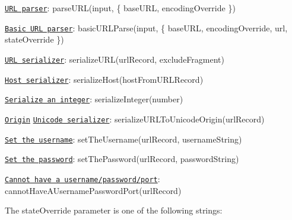 \begin{DoxyItemize}
\item \href{https://url.spec.whatwg.org/#concept-url-parser}{\tt U\+RL parser}\+: {\ttfamily parse\+U\+RL(input, \{ base\+U\+RL, encoding\+Override \})}
\item \href{https://url.spec.whatwg.org/#concept-basic-url-parser}{\tt Basic U\+RL parser}\+: {\ttfamily basic\+U\+R\+L\+Parse(input, \{ base\+U\+RL, encoding\+Override, url, state\+Override \})}
\item \href{https://url.spec.whatwg.org/#concept-url-serializer}{\tt U\+RL serializer}\+: {\ttfamily serialize\+U\+R\+L(url\+Record, exclude\+Fragment)}
\item \href{https://url.spec.whatwg.org/#concept-host-serializer}{\tt Host serializer}\+: {\ttfamily serialize\+Host(host\+From\+U\+R\+L\+Record)}
\item \href{https://url.spec.whatwg.org/#serialize-an-integer}{\tt Serialize an integer}\+: {\ttfamily serialize\+Integer(number)}
\item \href{https://url.spec.whatwg.org/#concept-url-origin}{\tt Origin} \href{https://html.spec.whatwg.org/multipage/browsers.html#unicode-serialisation-of-an-origin}{\tt Unicode serializer}\+: {\ttfamily serialize\+U\+R\+L\+To\+Unicode\+Origin(url\+Record)}
\item \href{https://url.spec.whatwg.org/#set-the-username}{\tt Set the username}\+: {\ttfamily set\+The\+Username(url\+Record, username\+String)}
\item \href{https://url.spec.whatwg.org/#set-the-password}{\tt Set the password}\+: {\ttfamily set\+The\+Password(url\+Record, password\+String)}
\item \href{https://url.spec.whatwg.org/#cannot-have-a-username-password-port}{\tt Cannot have a username/password/port}\+: {\ttfamily cannot\+Have\+A\+Username\+Password\+Port(url\+Record)}
\end{DoxyItemize}

The {\ttfamily state\+Override} parameter is one of the following strings\+:


